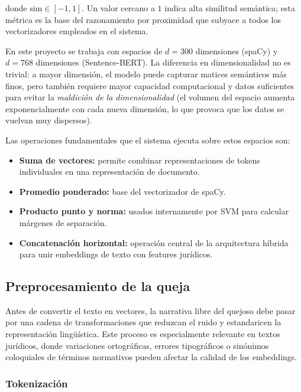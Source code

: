 donde $\text{sim} \in [-1, 1]$. Un valor cercano a $1$ indica alta similitud
semántica; esta métrica es la base del razonamiento por proximidad que subyace
a todos los vectorizadores empleados en el sistema.

En este proyecto se trabaja con espacios de $d = 300$ dimensiones (spaCy) y
$d = 768$ dimensiones (Sentence-BERT). La diferencia en dimensionalidad no es
trivial: a mayor dimensión, el modelo puede capturar matices semánticos más
finos, pero también requiere mayor capacidad computacional y datos suficientes
para evitar la \textit{maldición de la dimensionalidad} (el volumen del espacio
aumenta exponencialmente con cada nueva dimensión, lo que provoca que los datos
se vuelvan muy dispersos).

Las operaciones fundamentales que el sistema ejecuta sobre estos espacios son:

\begin{itemize}
  \item \textbf{Suma de vectores:} permite combinar representaciones de tokens
        individuales en una representación de documento.
  \item \textbf{Promedio ponderado:} base del vectorizador de spaCy.
  \item \textbf{Producto punto y norma:} usados internamente por SVM para
        calcular márgenes de separación.
  \item \textbf{Concatenación horizontal:} operación central de la arquitectura
        híbrida para unir embeddings de texto con features jurídicos.
\end{itemize}

\subsection{Preprocesamiento de la queja}

Antes de convertir el texto en vectores, la narrativa libre del quejoso debe
pasar por una cadena de transformaciones que reduzcan el ruido y estandaricen
la representación lingüística. Este proceso es especialmente relevante en textos
jurídicos, donde variaciones ortográficas, errores tipográficos o sinónimos
coloquiales de términos normativos pueden afectar la calidad de los embeddings.

\subsubsection*{Tokenización}

